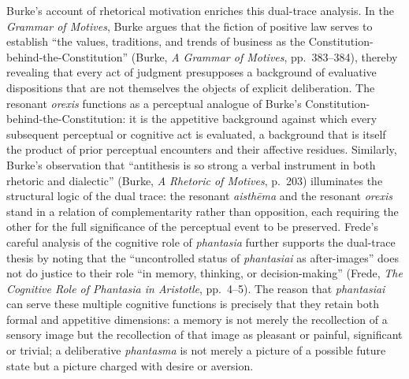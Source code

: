 \documentclass[12pt]{article}
\begin{document}
Burke's account of rhetorical motivation enriches this dual-trace analysis. In the \textit{Grammar of Motives}, Burke argues that the fiction of positive law serves to establish ``the values, traditions, and trends of business as the Constitution-behind-the-Constitution'' (Burke, \textit{A Grammar of Motives}, pp.~383--384), thereby revealing that every act of judgment presupposes a background of evaluative dispositions that are not themselves the objects of explicit deliberation. The resonant \textit{orexis} functions as a perceptual analogue of Burke's Constitution-behind-the-Constitution: it is the appetitive background against which every subsequent perceptual or cognitive act is evaluated, a background that is itself the product of prior perceptual encounters and their affective residues. Similarly, Burke's observation that ``antithesis is so strong a verbal instrument in both rhetoric and dialectic'' (Burke, \textit{A Rhetoric of Motives}, p.~203) illuminates the structural logic of the dual trace: the resonant \textit{aisthēma} and the resonant \textit{orexis} stand in a relation of complementarity rather than opposition, each requiring the other for the full significance of the perceptual event to be preserved. Frede's careful analysis of the cognitive role of \textit{phantasia} further supports the dual-trace thesis by noting that the ``uncontrolled status of \textit{phantasiai} as after-images'' does not do justice to their role ``in memory, thinking, or decision-making'' (Frede, \textit{The Cognitive Role of Phantasia in Aristotle}, pp.~4--5). The reason that \textit{phantasiai} can serve these multiple cognitive functions is precisely that they retain both formal and appetitive dimensions: a memory is not merely the recollection of a sensory image but the recollection of that image as pleasant or painful, significant or trivial; a deliberative \textit{phantasma} is not merely a picture of a possible future state but a picture charged with desire or aversion.
\end{document}
